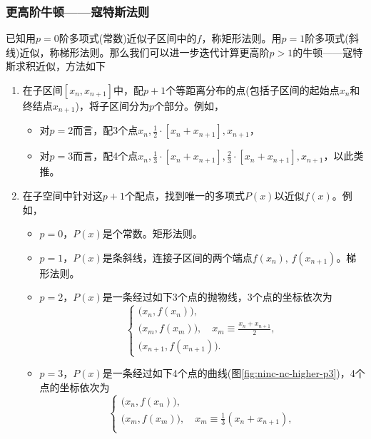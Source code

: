 \subsubsection{更高阶牛顿——寇特斯法则}
\label{sec:ninc-nc-higher-rule}
已知用$p=0$阶多项式(常数)近似子区间中的$f$，称矩形法则。用$p=1$阶多项式(斜线)近似，称梯形法则。那么我们可以进一步迭代计算更高阶$p > 1$的牛顿——寇特斯求积近似，方法如下
\begin{enumerate}
  \item 在子区间$\left[ x_{n}, x_{n+1} \right]$中，配$p+1$个等距离分布的点(包括子区间的起始点$x_{n}$和终结点$x_{n+1}$)，将子区间分为$p$个部分。例如，
  \begin{itemize}
    \item 对$p=2$而言，配3个点$x_{n}, \frac{1}{2} \cdot \left[ x_{n} + x_{n+1} \right] , x_{n+1}$，
    \item 对$p=3$而言，配4个点$x_{n}, \frac{1}{3} \cdot \left[ x_{n} + x_{n+1} \right] , \frac{2}{3} \cdot \left[ x_{n} + x_{n+1} \right], x_{n+1}$，以此类推。
  \end{itemize}
  \item 在子空间中针对这$p+1$个配点，找到唯一的多项式$P(x)$以近似$f(x)$。例如，
  \begin{itemize}
    \item $p=0$，$P(x)$是个常数。矩形法则。
    \item $p=1$，$P(x)$是条斜线，连接子区间的两个端点$f \left( x_{n} \right), \, f \left( x_{n+1} \right)$。梯形法则。
    \item $p=2$，$P(x)$是一条经过如下3个点的抛物线，3个点的坐标依次为
    \begin{equation*}
      \begin{cases}
        \Big( x_{n}, f \left( x_{n} \right) \Big), \\
        \Big( x_{m}, f \left( x_{m} \right) \Big), \quad x_{m} \equiv \frac{x_{n} + x_{n+1}}{2}, \\
        \Big( x_{n+1}, f \left( x_{n+1} \right) \Big).
      \end{cases}
    \end{equation*}
    \item $p=3$，$P(x)$是一条经过如下4个点的曲线(图\ref{fig:ninc-nc-higher-p3})，4个点的坐标依次为
    \begin{equation*}
      \begin{cases}
        \Big( x_{n}, f \left( x_{n} \right) \Big), \\
        \Big( x_{m}, f \left( x_{m} \right) \Big), \quad x_{m} \equiv \frac{1}{3} \left( x_{n} + x_{n+1} \right), \\

\end{cases}
\end{equation*}
\end{itemize}
\end{enumerate}
